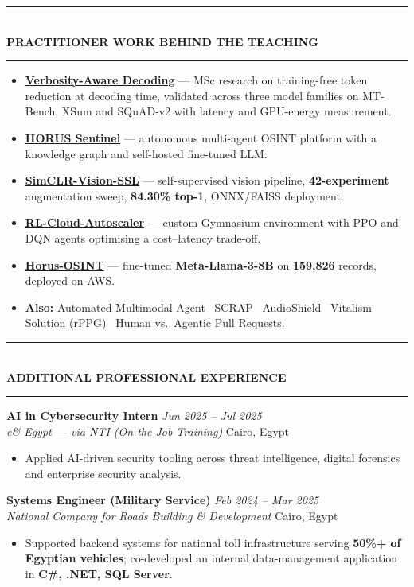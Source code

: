 \documentclass[10pt, a4paper]{article}
\newcommand{\cvsection}[1]{%
  \vspace{3pt}%
  {\color{navy}\rule{\linewidth}{1.1pt}}\\[0.5pt]%
  {\color{navy}\bfseries\fontsize{9.5}{11}\selectfont\uppercase{#1}}\\[-4pt]%
  {\color{teal}\rule{\linewidth}{0.6pt}}%
  \vspace{2pt}%
}
\newcommand{\cventry}[4]{%
  \vspace{2.5pt}%
  \textbf{\color{darkgray}#1} \hfill {\color{midgray}\textit{#3}}\\[-1.5pt]%
  {\color{teal}\textit{#2}} \hfill {\color{midgray}#4}%
}
\newcommand{\cvmini}[2]{\item {\bfseries\color{navy}#1} --- #2}
\newenvironment{cvitems}{%
  \begin{itemize}[leftmargin=11pt, itemsep=0.5pt, parsep=0pt, topsep=1pt,
                  label={\textcolor{teal}{$\bullet$}}]
}{%
  \end{itemize}%
}
\begin{document}
\cvsection{Practitioner Work Behind the Teaching}

\begin{cvitems}
  \cvmini{\href{https://github.com/MahmoudAlyosify/minimal-lm}{Verbosity-Aware Decoding}}{MSc research on training-free token reduction at decoding time, validated across three model families on MT-Bench, XSum and SQuAD-v2 with latency and GPU-energy measurement.}
  \cvmini{\href{https://github.com/MahmoudAlyosify/horus-sentinel}{HORUS Sentinel}}{autonomous multi-agent OSINT platform with a knowledge graph and self-hosted fine-tuned LLM.}
  \cvmini{\href{https://github.com/MahmoudAlyosify/SimCLR-Vision-SSL}{SimCLR-Vision-SSL}}{self-supervised vision pipeline, \textbf{42-experiment} augmentation sweep, \textbf{84.30\% top-1}, ONNX/FAISS deployment.}
  \cvmini{\href{https://github.com/MahmoudAlyosify/RL-Cloud-Autoscaler}{RL-Cloud-Autoscaler}}{custom Gymnasium environment with PPO and DQN agents optimising a cost--latency trade-off.}
  \cvmini{\href{https://github.com/MahmoudAlyosify/Horus-OSINT}{Horus-OSINT}}{fine-tuned \textbf{Meta-Llama-3-8B} on \textbf{159,826} records, deployed on AWS.}
  \item \textbf{Also:} Automated Multimodal Agent \textperiodcentered\ SCRAP \textperiodcentered\ AudioShield \textperiodcentered\ Vitalism Solution (rPPG) \textperiodcentered\ Human vs.\ Agentic Pull Requests.
\end{cvitems}

\cvsection{Additional Professional Experience}

\cventry{AI in Cybersecurity Intern}{e\& Egypt --- via NTI (On-the-Job Training)}
        {Jun 2025 -- Jul 2025}{Cairo, Egypt}
\begin{cvitems}
  \item Applied AI-driven security tooling across threat intelligence, digital forensics and enterprise security analysis.
\end{cvitems}

\cventry{Systems Engineer (Military Service)}{National Company for Roads Building \& Development}
        {Feb 2024 -- Mar 2025}{Cairo, Egypt}
\begin{cvitems}
  \item Supported backend systems for national toll infrastructure serving \textbf{50\%+ of Egyptian vehicles}; co-developed an internal data-management application in \textbf{C\#, .NET, SQL Server}.
\end{cvitems}
\end{document}
